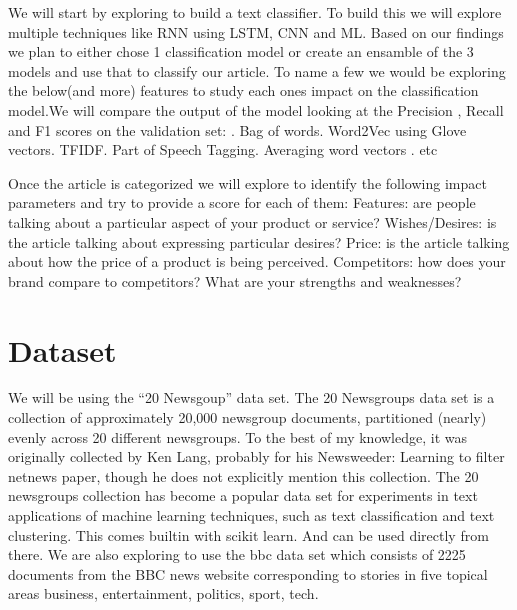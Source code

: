 \documentclass{article}
\begin{document}
We will start by exploring to build a text classifier. To build this we will explore multiple techniques like RNN using LSTM, CNN and ML. Based on our findings we plan to either chose 1 classification model or create an ensamble of the 3 models and use that to classify our article. To name a few we would be exploring the below(and more) features to study each ones impact on the classification model.We will compare the output of the model looking at the  Precision , Recall and F1 scores on the validation set: . Bag of words. Word2Vec using Glove vectors. TFIDF. Part of Speech Tagging. Averaging word vectors . etc\newline

Once the article is categorized we will explore to identify the following impact parameters and try to provide a score for each of them:
Features: are people talking about a particular aspect of your product or service?
Wishes/Desires: is the article talking about expressing particular desires?\newline
Price: is the article talking about how the price of a product is being perceived.
Competitors: how does your brand compare to competitors? What are your strengths and weaknesses?


\maketitle %


\section*{Dataset} %

We will be using the “20 Newsgoup” data set. The 20 Newsgroups data set is a collection of approximately 20,000 newsgroup documents, partitioned (nearly) evenly across 20 different newsgroups. To the best of my knowledge, it was originally collected by Ken Lang, probably for his Newsweeder: Learning to filter netnews paper, though he does not explicitly mention this collection. The 20 newsgroups collection has become a popular data set for experiments in text applications of machine learning techniques, such as text classification and text clustering. This comes builtin with scikit learn. And can be used directly from there. \newline
We are also exploring to use the bbc data set which consists of 2225 documents from the BBC news website corresponding to stories in five topical areas business, entertainment, politics, sport, tech. 
\end{document}
